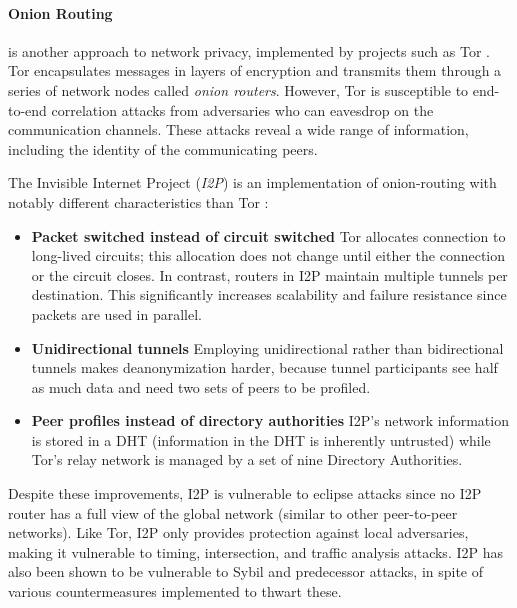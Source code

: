 \paragraph{Onion Routing} is another approach to network privacy, implemented by projects such as Tor \cite{tor}. Tor encapsulates messages in layers of encryption and transmits them through a series of network nodes called \textit{onion routers}. However, Tor is susceptible to end-to-end correlation attacks from adversaries who can eavesdrop on the communication channels. These attacks reveal a wide range of information, including the identity of the communicating peers.

The Invisible Internet Project (\textit{I2P}) is an implementation of onion-routing with notably different characteristics than Tor \cite{i2p}:

\begin{itemize}

    \item \textbf{Packet switched instead of circuit switched}
          Tor allocates connection to long-lived circuits; this allocation does not change until either the connection or the circuit closes. In contrast, routers in I2P maintain multiple tunnels per destination. This significantly increases scalability and failure resistance since packets are used in parallel.

    \item \textbf{Unidirectional tunnels}
          Employing unidirectional rather than bidirectional tunnels makes deanonymization harder, because tunnel participants see half as much data and need two sets of peers to be profiled.

    \item \textbf{Peer profiles instead of directory authorities}
          I2P’s network information is stored in a DHT (information in the DHT is inherently untrusted) while Tor’s relay network is managed by a set of nine Directory Authorities.
\end{itemize}

Despite these improvements, I2P is vulnerable to eclipse attacks since no I2P router has a full view of the global network (similar to other peer-to-peer networks). Like Tor, I2P only provides protection against local adversaries, making it vulnerable to timing, intersection, and traffic analysis attacks. I2P has also been shown to be vulnerable to Sybil and predecessor attacks, in spite of various countermeasures implemented to thwart these.

